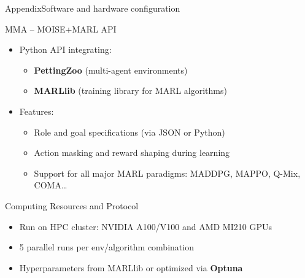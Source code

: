 \begin{frame}{Appendix}{Software and hardware configuration}

    \begin{block}{MMA – MOISE+MARL API}
        \begin{itemize}
            \item Python API integrating:
                  \begin{itemize}
                      \item \textbf{PettingZoo} (multi-agent environments)
                      \item \textbf{MARLlib} (training library for MARL algorithms)
                  \end{itemize}
            \item Features:
                  \begin{itemize}
                      \item Role and goal specifications (via JSON or Python)
                      \item Action masking and reward shaping during learning
                      \item Support for all major MARL paradigms: MADDPG, MAPPO, Q-Mix, COMA\dots
                  \end{itemize}
        \end{itemize}
    \end{block}

    \vspace{0.5em}

    \begin{block}{Computing Resources and Protocol}
        \begin{itemize}
            \item Run on HPC cluster: NVIDIA A100/V100 and AMD MI210 GPUs
            \item 5 parallel runs per env/algorithm combination
            \item Hyperparameters from MARLlib or optimized via \textbf{Optuna}~\autocite{akiba2019optuna}
        \end{itemize}
    \end{block}

\end{frame}

